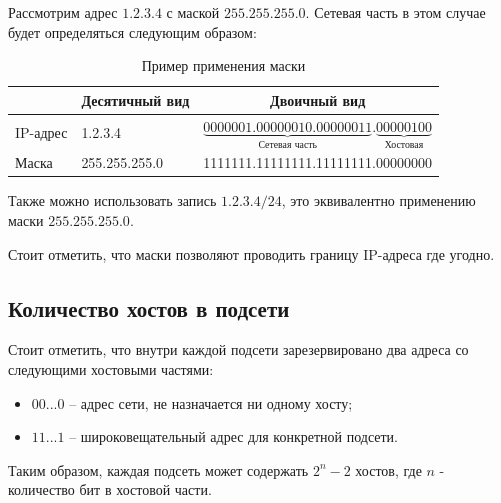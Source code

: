 \begin{exmp}
Рассмотрим адрес $1.2.3.4$ с маской $255.255.255.0$. Сетевая часть в этом случае будет определяться следующим образом:
\begin{table}[h!]
	\centering
	\begin{tabular}{|l|l|l|}
		\hline
		\multicolumn{1}{|l|}{} & \multicolumn{1}{c|}{Десятичный вид} & \multicolumn{1}{c|}{Двоичный вид}  \\ \hline
		IP-адрес & 1.2.3.4        & $\underbrace{0000001.00000010.00000011}_\text{Сетевая часть}.\underbrace{00000100}_\text{Хостовая}$ \\ \hline
		Маска    & 255.255.255.0  & 1111111.11111111.11111111.00000000 \\ \hline
	\end{tabular}
	\caption{Пример применения маски}
	\label{tbl:ip_maskexample}
\end{table}

Также можно использовать запись $1.2.3.4/24$, это эквивалентно применению маски $255.255.255.0$.
\end{exmp}

Стоит отметить, что маски позволяют проводить границу IP-адреса где угодно. 

\subsection{Количество хостов в подсети}
Стоит отметить, что внутри каждой подсети зарезервировано два адреса со следующими хостовыми частями:
\begin{itemize}
	\item $00...0$ -- адрес сети, не назначается ни одному хосту;
	\item $11...1$ -- широковещательный адрес для конкретной подсети.
\end{itemize}

Таким образом, каждая подсеть может содержать $2^n-2$ хостов, где $n$ - количество бит в хостовой части.

